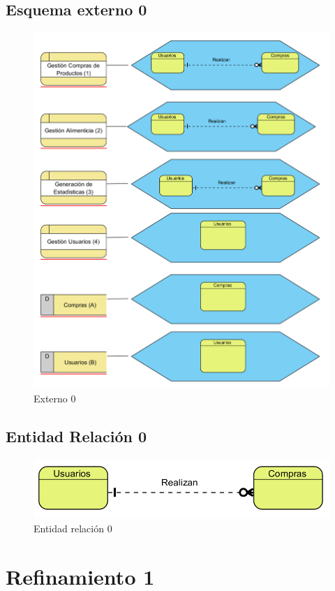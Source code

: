 \documentclass[a4paper,12pt]{report}
\begin{document}
\section{Esquema externo 0}
\label{sec-4-2}
\begin{figure}[!htp]
\centering
\includegraphics[width=0.9\linewidth]{./refinamientos/externo0.png}
\caption{Externo 0}
\label{fig:Externo 0}
\medskip
\footnotesize
{}
\end{figure}
\section{Entidad Relación 0}
\label{sec-4-3}
\begin{figure}[!htp]
\centering
\includegraphics[width=0.6\linewidth]{./refinamientos/er0.png}
\caption{Entidad relación 0}
\label{fig:Entidad relación 0}
\medskip
\footnotesize
{}
\end{figure}
\chapter{Refinamiento 1}
\label{sec-5}
\end{document}
